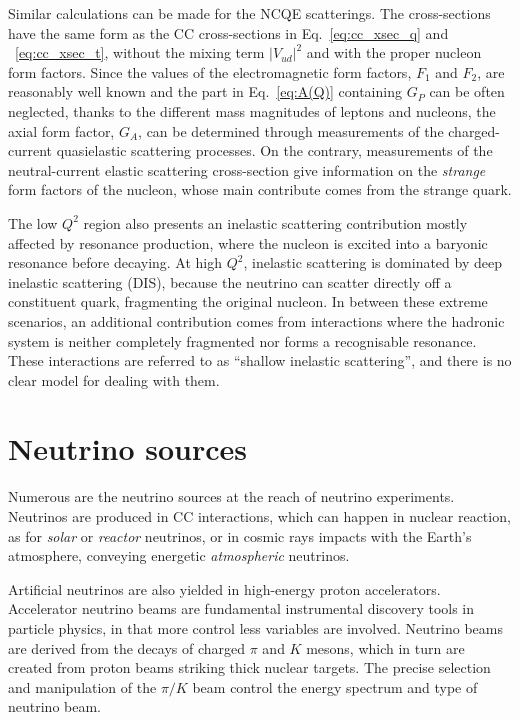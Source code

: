 Similar calculations can be made for the NCQE scatterings.
The cross-sections have the same form as the CC cross-sections in Eq.~\ref{eq:cc_xsec_q} and ~\ref{eq:cc_xsec_t}, %
without the mixing term $|V_{ud}|^2$ and with the proper nucleon form factors.
Since the values of the electromagnetic form factors, $F_1$ and $F_2$, are reasonably well known and the part %
in Eq.~\ref{eq:A(Q)} containing $G_P$ can be often neglected, thanks to the different mass magnitudes of %
leptons and nucleons, the axial form factor, $G_A$, can be determined through measurements of the charged-current %
quasielastic scattering processes.
On the contrary, measurements of the neutral-current elastic scattering cross-section give information %
on the \emph{strange} form factors of the nucleon, whose main contribute comes from the strange quark.

The low $Q^2$ region also presents an inelastic scattering contribution mostly affected by resonance production, %
where the nucleon is excited into a baryonic resonance before decaying.
At high $Q^2$, inelastic scattering is dominated by deep inelastic scattering (DIS), because the neutrino can scatter %
directly off a constituent quark, fragmenting the original nucleon.
In between these extreme scenarios, an additional contribution comes from interactions where the hadronic %
system is neither completely fragmented nor forms a recognisable resonance.
These interactions are referred to as ``shallow inelastic scattering'', and there is no clear model for dealing %
with them.

\section{Neutrino sources}
\label{sec:prod}

Numerous are the neutrino sources at the reach of neutrino experiments.
Neutrinos are produced in CC interactions, which can happen in nuclear reaction, as for \emph{solar} %
or \emph{reactor} neutrinos, or in cosmic rays impacts with the Earth's atmosphere, %
conveying energetic \emph{atmospheric} neutrinos.

Artificial neutrinos are also yielded in high-energy proton accelerators.
Accelerator neutrino beams are fundamental instrumental discovery tools in particle physics, in that more control %
less variables are involved.
Neutrino beams are derived from the decays of charged $\pi$ and $K$ mesons, which in turn are created from %
proton beams striking thick nuclear targets.
The precise selection and manipulation of the $\pi/K$ beam control the energy spectrum and type of neutrino beam.

